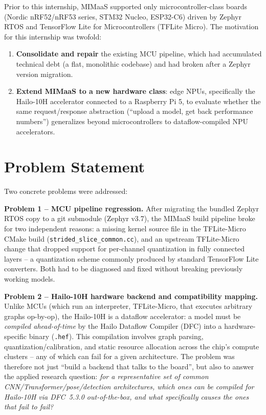 \documentclass[11pt]{article}
\begin{document}
Prior to this internship, MIMaaS supported only microcontroller-class boards
(Nordic nRF52/nRF53 series, STM32 Nucleo, ESP32-C6) driven by Zephyr RTOS and
TensorFlow Lite for Microcontrollers (TFLite Micro). The motivation for this
internship was twofold:

\begin{enumerate}
  \item \textbf{Consolidate and repair} the existing MCU pipeline, which had
    accumulated technical debt (a flat, monolithic codebase) and had broken
    after a Zephyr version migration.
  \item \textbf{Extend MIMaaS to a new hardware class}: edge NPUs, specifically
    the Hailo-10H accelerator connected to a Raspberry Pi 5, to evaluate whether
    the same request/response abstraction (``upload a model, get back
    performance numbers'') generalizes beyond microcontrollers to
    dataflow-compiled NPU accelerators.
\end{enumerate}

\section{Problem Statement}

Two concrete problems were addressed:

\textbf{Problem 1 -- MCU pipeline regression.} After migrating the bundled
Zephyr RTOS copy to a git submodule (Zephyr v3.7), the MIMaaS build pipeline
broke for two independent reasons: a missing kernel source file in the
TFLite-Micro CMake build (\texttt{strided\_slice\_common.cc}), and an upstream
TFLite-Micro change that dropped support for per-channel quantization in fully
connected layers -- a quantization scheme commonly produced by standard
TensorFlow Lite converters. Both had to be diagnosed and fixed without
breaking previously working models.

\textbf{Problem 2 -- Hailo-10H hardware backend and compatibility mapping.}
Unlike MCUs (which run an interpreter, TFLite-Micro, that executes arbitrary
graphs op-by-op), the Hailo-10H is a dataflow accelerator: a model must be
\emph{compiled ahead-of-time} by the Hailo Dataflow Compiler (DFC) into a
hardware-specific binary (\texttt{.hef}). This compilation involves graph
parsing, quantization/calibration, and static resource allocation across the
chip's compute clusters -- any of which can fail for a given architecture.
The problem was therefore not just ``build a backend that talks to the
board'', but also to answer the applied research question: \emph{for a
representative set of common CNN/Transformer/pose/detection architectures,
which ones can be compiled for Hailo-10H via DFC~5.3.0 out-of-the-box, and
what specifically causes the ones that fail to fail?}
\end{document}
